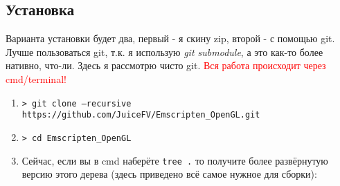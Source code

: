 \documentclass[12pt]{article}
\begin{document}
    \subsection{Установка}
    Варианта установки будет два, первый - я скину zip, второй - с помощью git.
    Лучше пользоваться git, т.к. я использую \emph{git submodule}, а 
    это как-то более нативно, что-ли. Здесь я рассмотрю чисто git. 
    \textcolor{red}{Вся работа происходит через cmd/terminal!}

    \begin{enumerate}
        \item \texttt{> git clone ---recursive https://github.com/JuiceFV/Emscripten\_OpenGL.git}
        \item \texttt{> cd Emscripten\_OpenGL}
        \item Сейчас, если вы в cmd наберёте \colorbox{gray!25!}{\texttt{tree .}}
        то получите более развёрнутую версию этого дерева (здесь приведено всё
        самое нужное для сборки):


\end{enumerate}
\end{document}
